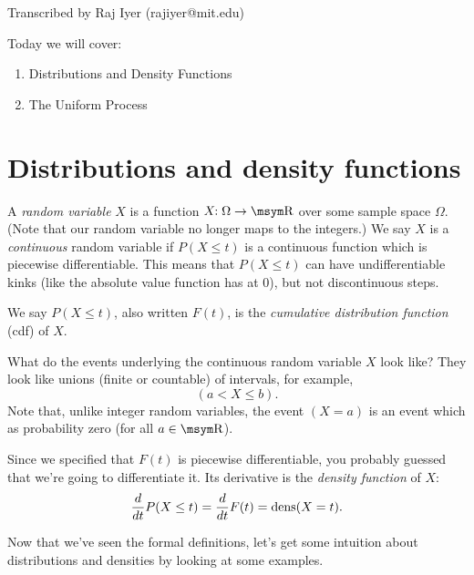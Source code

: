 \newline
{}\newline
\noindent Transcribed by Raj Iyer (rajiyer@mit.edu)\newline
\medskip

\noindent Today we will cover:
\begin{enumerate}
\nolineskips
  \item 
Distributions and Density Functions
  \item
The Uniform Process
\end{enumerate}

\section{Distributions and density functions}

A {\em random variable} $X$ is a function
$X\!\!:\Omega\rightarrow \reals$ over some sample space $\Omega$.
(Note that our random variable no longer maps to the integers.)
We say $X$ is a {\em continuous} random variable if 
$P(X\leq t)$ is a continuous function which is piecewise
differentiable.  
This means that $P(X\leq t)$ can have undifferentiable kinks (like the
absolute value function has at 0), but not discontinuous steps.  

We say
$P(X\leq t)$, also written $F(t)$, is the {\em cumulative distribution
function} (cdf) of $X$. 

What do the events underlying the continuous random variable $X$ look like? 
They look like unions (finite or countable) of intervals, for example, 
\[
(a < X \leq b).
\]
Note that, unlike integer random variables, the event $(X=a)$ is an
event which as probability zero (for all $a\in\reals$).

Since we specified that $F(t)$ is piecewise differentiable, you probably
guessed that we're going to differentiate it.  Its derivative is the
{\em density function} of $X$:
\[
  \frac{d}{dt}P(X\leq t) = \frac{d}{dt} F(t) = \mbox{dens}(X=t).
\]

Now that we've seen the formal definitions, let's get some intuition
about distributions and densities by looking at some examples.

\medskip


\medskip


